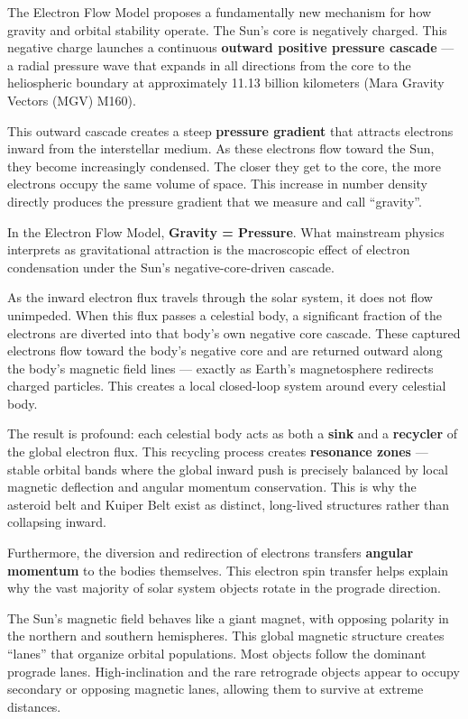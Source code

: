 \documentclass[11pt, a4paper]{article}
\begin{document}
The Electron Flow Model proposes a fundamentally new mechanism for how gravity and orbital stability operate. The Sun's core is negatively charged. This negative charge launches a continuous \textbf{outward positive pressure cascade} --- a radial pressure wave that expands in all directions from the core to the heliospheric boundary at approximately 11.13 billion kilometers (Mara Gravity Vectors (MGV) M160).

This outward cascade creates a steep \textbf{pressure gradient} that attracts electrons inward from the interstellar medium. As these electrons flow toward the Sun, they become increasingly condensed. The closer they get to the core, the more electrons occupy the same volume of space. This increase in number density directly produces the pressure gradient that we measure and call ``gravity''.

In the Electron Flow Model, \textbf{Gravity = Pressure}. What mainstream physics interprets as gravitational attraction is the macroscopic effect of electron condensation under the Sun's negative-core-driven cascade.

As the inward electron flux travels through the solar system, it does not flow unimpeded. When this flux passes a celestial body, a significant fraction of the electrons are diverted into that body's own negative core cascade. These captured electrons flow toward the body's negative core and are returned outward along the body's magnetic field lines --- exactly as Earth's magnetosphere redirects charged particles. This creates a local closed-loop system around every celestial body.

The result is profound: each celestial body acts as both a \textbf{sink} and a \textbf{recycler} of the global electron flux. This recycling process creates \textbf{resonance zones} --- stable orbital bands where the global inward push is precisely balanced by local magnetic deflection and angular momentum conservation. This is why the asteroid belt and Kuiper Belt exist as distinct, long-lived structures rather than collapsing inward.

Furthermore, the diversion and redirection of electrons transfers \textbf{angular momentum} to the bodies themselves. This electron spin transfer helps explain why the vast majority of solar system objects rotate in the prograde direction.

The Sun's magnetic field behaves like a giant magnet, with opposing polarity in the northern and southern hemispheres. This global magnetic structure creates ``lanes'' that organize orbital populations. Most objects follow the dominant prograde lanes. High-inclination and the rare retrograde objects appear to occupy secondary or opposing magnetic lanes, allowing them to survive at extreme distances.
\end{document}

